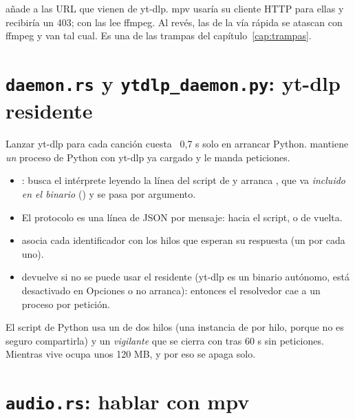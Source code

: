  añade  a las URL que vienen de yt-dlp. mpv usaría su cliente
HTTP para ellas y recibiría un 403; con  las lee ffmpeg. Al revés, las de la vía
rápida se atascan con ffmpeg y van tal cual. Es una de las trampas del capítulo~\ref{cap:trampas}.

\section{\texttt{daemon.rs} y \texttt{ytdlp\_daemon.py}: yt-dlp residente}

Lanzar yt-dlp para cada canción cuesta ~0,7 s solo en arrancar Python. 
mantiene \emph{un} proceso de Python con yt-dlp ya cargado y le manda peticiones.

\begin{itemize}
  \item {}: busca el intérprete leyendo la línea \cod{#!} del script de 
  y arranca , que va \emph{incluido en el binario}
  () y se pasa por argumento.
  \item El protocolo es una línea de JSON por mensaje:  hacia el script,
   o  de vuelta.
  \item {} asocia cada identificador con los hilos que esperan su respuesta (un
   por cada uno).
  \item {} devuelve  si no se puede usar el residente (yt-dlp es un
  binario autónomo, está desactivado en Opciones o no arranca): entonces el resolvedor cae a un
  proceso por petición.
\end{itemize}

El script de Python usa un  de dos hilos (una instancia de
 por hilo, porque no es seguro compartirla) y un \emph{vigilante} que se
cierra con  tras 60 s sin peticiones. Mientras vive ocupa unos 120 MB, y por
eso se apaga solo.

\section{\texttt{audio.rs}: hablar con mpv}

